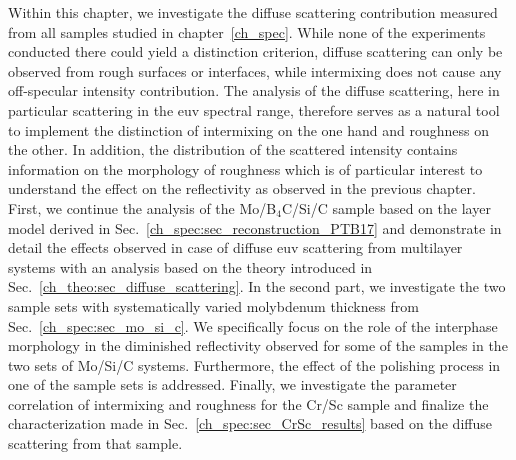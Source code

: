 Within this chapter, we investigate the diffuse scattering contribution measured from all samples studied in chapter~\ref{ch_spec}. While none of the experiments conducted there could yield a distinction criterion, diffuse scattering can only be observed from rough surfaces or interfaces, while intermixing does not cause any off-specular intensity contribution. The analysis of the diffuse scattering, here in particular scattering in the \gls{euv} spectral range, therefore serves as a natural tool to implement the distinction of intermixing on the one hand and roughness on the other. In addition, the distribution of the scattered intensity contains information on the morphology of roughness which is of particular interest to understand the effect on the reflectivity as observed in the previous chapter. First, we continue the analysis of the Mo/B$_4$C/Si/C sample based on the layer model derived in Sec.~\ref{ch_spec:sec_reconstruction_PTB17} and demonstrate in detail the effects observed in case of diffuse \gls{euv} scattering from multilayer systems with an analysis based on the theory introduced in Sec.~\ref{ch_theo:sec_diffuse_scattering}. In the second part, we investigate the two sample sets with systematically varied molybdenum thickness from Sec.~\ref{ch_spec:sec_mo_si_c}. We specifically focus on the role of the interphase morphology in the diminished reflectivity observed for some of the samples in the two sets of Mo/Si/C systems. Furthermore, the effect of the polishing process in one of the sample sets is addressed. Finally, we investigate the parameter correlation of intermixing and roughness for the Cr/Sc sample and finalize the characterization made in Sec.~\ref{ch_spec:sec_CrSc_results} based on the diffuse scattering from that sample.


